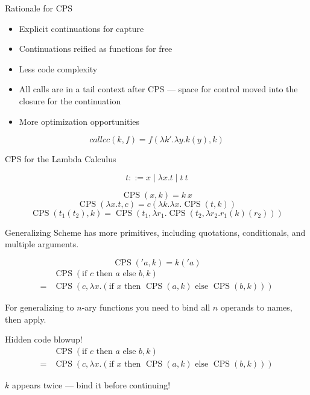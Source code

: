\documentclass{beamer}
\begin{document}
\begin{frame}{Rationale for CPS}
  \begin{itemize}
  \item Explicit continuations for capture
  \item Continuations reified as functions for free
  \item Less code complexity
  \item All calls are in a tail context after CPS --- space for control moved into the closure for the continuation
  \item More optimization opportunities
  \end{itemize}
  
  \[callcc(k, f)=f(\lambda k'.\lambda y.k(y), k)\]
\end{frame}

\newcommand{\CPS}{\operatorname{CPS}}

\begin{frame}{CPS for the Lambda Calculus}
  \begin{definition}
    \[t ::= x \mid \lambda x.t \mid t\ t\]
  \end{definition}
  
  \begin{theorem}
    \[\CPS(x, k)=k\ x\]
    \[\CPS(\lambda x.t, c)=c(\lambda k.\lambda x. \CPS(t, k))\]
    \[\CPS(t_1(t_2), k)=\CPS(t_1,\lambda r_1.\CPS(t_2,\lambda r_2.r_1(k)(r_2)))\]
  \end{theorem}
\end{frame}

\begin{frame}{Generalizing}
  Scheme has more primitives, including quotations, conditionals, and multiple arguments.

  \[\CPS('a,k)=k('a)\]
  \[\begin{aligned}
    &\CPS(\text{if }c\text{ then }a\text{ else }b, k)\\
    =&\CPS(c, \lambda x.(\text{if }x\text{ then }\CPS(a,k)\text{ else }\CPS(b,k)))
  \end{aligned}\]

For generalizing to $n$-ary functions you need to bind all $n$ operands to names, then apply.
\end{frame}

\begin{frame}[fragile]{Hidden code blowup!}
  \[\begin{aligned}
    &\CPS(\text{if }c\text{ then }a\text{ else }b, k)\\
    =&\CPS(c, \lambda x.(\text{if }x\text{ then }\CPS(a,k)\text{ else }\CPS(b,k)))
  \end{aligned}\]

$k$ appears twice --- bind it before continuing!
\end{frame}
\end{document}
